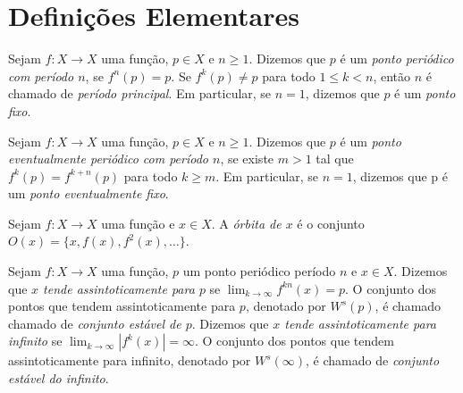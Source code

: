 \section{Definições Elementares}

 
\begin{definition}
Sejam $f: X \to X$ uma função, $p \in X$ e $n \geq 1$.  Dizemos que $p$ é um \textit{ponto periódico com período $n$}, se $f^n(p) = p$. Se $f^k(p) \neq p$ para todo $1 \leq k < n$, então $n$ é chamado de \textit{período principal}. Em particular, se $n=1$, dizemos que $p$ é um \textit{ponto fixo}.%
\end{definition}

\begin{definition}
Sejam $f: X \to X$ uma função, $p \in X$ e $n \geq 1$. Dizemos que $p$ é um \textit{ponto eventualmente periódico com período $n$}, se existe $m > 1$ tal que $f^k(p) = f^{k+n}(p)$ para todo $k \geq m$. Em particular, se $n = 1$, dizemos que p é um \textit{ponto eventualmente fixo}.
\end{definition}

\begin{definition}
Sejam $f:X \to X$ uma função e $x \in X$. A \textit{órbita de $x$} é o conjunto $O(x) = \lbrace x, f(x), f^2(x), \dots \rbrace$.
\end{definition}

\begin{definition}
Sejam $f: X \to X$ uma função, $p$ um ponto periódico período $n$ e $x \in X$. Dizemos que \textit{$x$ tende assintoticamente para $p$} se $\lim_{k \to \infty} f^{kn}(x) = p$. O conjunto dos pontos que tendem assintoticamente para $p$, denotado por $W^s(p)$, é chamado chamado de \textit{conjunto estável de $p$}. Dizemos que \textit{$x$ tende assintoticamente para infinito} se $\lim_{k \to \infty} |f^{k}(x)| = \infty$. O conjunto dos pontos que tendem assintoticamente para infinito, denotado por $W^s(\infty)$, é chamado de \textit{conjunto estável do infinito}.
\end{definition}

